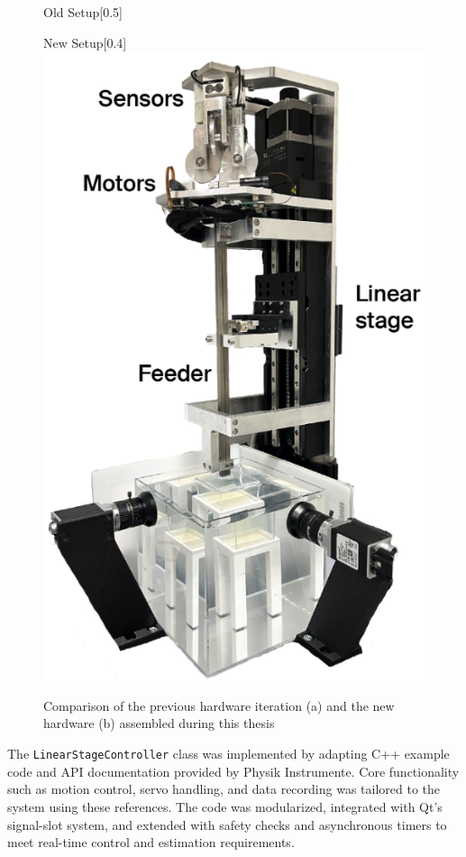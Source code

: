 \begin{figure}[H]
\begin{subcaptionbox}{Old Setup\label{fig:left}}[0.5\linewidth]
    \end{subcaptionbox}
    \hspace{0.05\linewidth}
    \begin{subcaptionbox}{New Setup\label{fig:right}}[0.4\linewidth]
        {\includegraphics[width=\linewidth]{images/Hardware/insertionStrategy.PNG}}
    \end{subcaptionbox}
    \caption{Comparison of the previous hardware iteration (a) and the new hardware (b) assembled during this thesis}
    \label{fig:hardwarecompare}
\end{figure}
The \texttt{LinearStageController} class was implemented by adapting C++ example code and API documentation provided by Physik Instrumente. Core functionality such as motion control, servo handling, and data recording was tailored to the system using these references. The code was modularized, integrated with Qt’s signal-slot system, and extended with safety checks and asynchronous timers to meet real-time control and estimation requirements.

